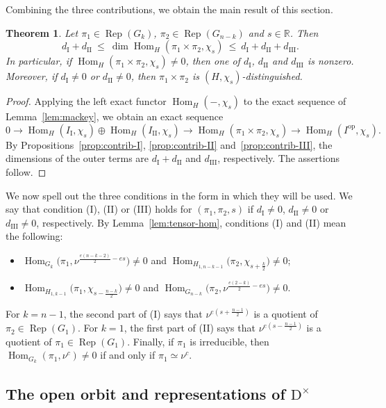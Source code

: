 \documentclass[11pt]{amsart}
\numberwithin{equation}{section}
\theoremstyle{plain}
\newtheorem{theorem}{Theorem}[section]
\theoremstyle{definition}
\theoremstyle{remark}
\newcommand{\R}{\mathbb{R}}
\DeclareMathOperator{\Hom}{Hom}
\DeclareMathOperator{\Rep}{Rep}
\newcommand{\dI}{d_{\mathrm{I}}}
\newcommand{\dII}{d_{\mathrm{II}}}
\newcommand{\dIII}{d_{\mathrm{III}}}
\begin{document}
Combining the three contributions, we obtain the main result of this section.

\begin{theorem}\label{thm:orbit-bound}
	Let $\pi_1\in\Rep(G_k)$, $\pi_2\in\Rep(G_{n-k})$ and $s\in\R$. Then
	$$
	\dI+\dII\ \le\ \dim\Hom_H(\pi_1\times\pi_2,\chi_s)\ \le\ \dI+\dII+\dIII.
	$$
	In particular, if $\Hom_H(\pi_1\times\pi_2,\chi_s)\ne0$, then one of $\dI$, $\dII$ and $\dIII$ is nonzero. Moreover, if $\dI\ne0$ or $\dII\ne0$, then $\pi_1\times\pi_2$ is $(H,\chi_s)$-distinguished.
\end{theorem}

\begin{proof}
	Applying the left exact functor $\Hom_H(-,\chi_s)$ to the exact sequence of Lemma~\ref{lem:mackey}, we obtain an exact sequence
	$$
	0\to\Hom_H(I_{\mathrm I},\chi_s)\oplus\Hom_H(I_{\mathrm{II}},\chi_s)\to\Hom_H(\pi_1\times\pi_2,\chi_s)\to\Hom_H(I^{\mathrm{op}},\chi_s).
	$$
	By Propositions~\ref{prop:contrib-I}, \ref{prop:contrib-II} and~\ref{prop:contrib-III}, the dimensions of the outer terms are $\dI+\dII$ and $\dIII$, respectively. The assertions follow.
\end{proof}

We now spell out the three conditions in the form in which they will be used. We say that condition (I), (II) or (III) holds for $(\pi_1,\pi_2,s)$ if $\dI\ne0$, $\dII\ne0$ or $\dIII\ne0$, respectively. By Lemma~\ref{lem:tensor-hom}, conditions (I) and (II) mean the following:
\begin{itemize}
	\item[(I)] $\Hom_{G_k}\big(\pi_1,\nu^{\frac{e(n-k-2)}2-es}\big)\ne0$ and $\Hom_{H_{1,n-k-1}}\big(\pi_2,\chi_{s+\frac k2}\big)\ne0$;
	\item[(II)] $\Hom_{H_{1,k-1}}\big(\pi_1,\chi_{s-\frac{n-k}2}\big)\ne0$ and $\Hom_{G_{n-k}}\big(\pi_2,\nu^{\frac{e(2-k)}2-es}\big)\ne0$.
\end{itemize}
For $k=n-1$, the second part of (I) says that $\nu^{e(s+\frac{n-1}2)}$ is a quotient of $\pi_2\in\Rep(G_1)$. For $k=1$, the first part of (II) says that $\nu^{e(s-\frac{n-1}2)}$ is a quotient of $\pi_1\in\Rep(G_1)$. Finally, if $\pi_1$ is irreducible, then $\Hom_{G_k}(\pi_1,\nu^c)\ne0$ if and only if $\pi_1\simeq\nu^c$.

\subsection{The open orbit and representations of \texorpdfstring{$\mathrm{D}^\times$}{Dx}}\label{ss:open-orbit}
\end{document}
